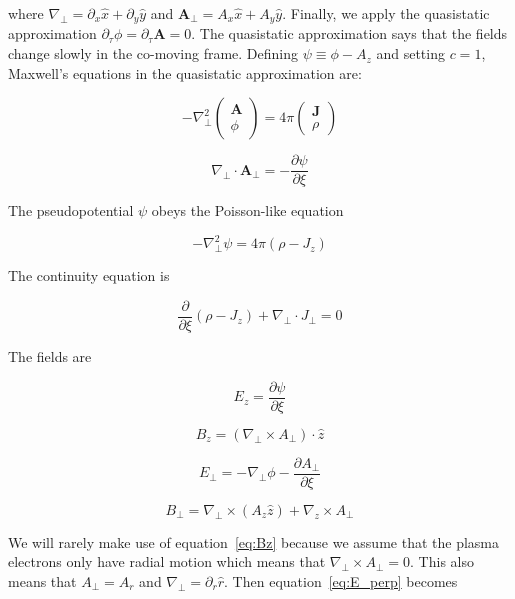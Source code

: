 \documentclass[aps,prl,preprint,groupedaddress]{revtex4-1}
\newcommand{\webvector}[2]{\left( \begin{array}{c} #1 \\ #2 \end{array} \right)}
\begin{document}
where $\nabla_\perp = \partial_x \hat x + \partial_y \hat y$ and $\mathbf{A}_\perp = A_x \hat x + A_y \hat y$. Finally, we apply the quasistatic approximation $\partial_\tau \phi = \partial_\tau \mathbf{A} = 0$. The quasistatic approximation says that the fields change slowly in the co-moving frame. Defining $\psi \equiv \phi - A_z$ and setting $c = 1$, Maxwell's equations in the quasistatic approximation are:

\begin{equation}\label{eq:max_qs}
-\nabla^2_\perp \webvector{\mathbf{A}}{\phi} = 4\pi \webvector{\mathbf{J}}{\rho}
\end{equation}

\begin{equation}\label{eq:gauge_qs}
\nabla_\perp \cdot \mathbf{A}_\perp = -\frac{\partial \psi}{\partial \xi}
\end{equation}

The pseudopotential $\psi$ obeys the Poisson-like equation

\begin{equation}\label{eq:Poisson}
-\nabla^2_\perp \psi = 4\pi(\rho - J_z)
\end{equation}

The continuity equation is

\begin{equation}\label{eq:Cont}
\frac{\partial}{\partial \xi} (\rho - J_z) + \nabla_\perp \cdot J_\perp = 0
\end{equation}

The fields are 

\begin{equation}\label{eq:Ez}
E_z = \frac{\partial \psi}{\partial \xi}
\end{equation} 

\begin{equation}\label{eq:Bz}
B_z = (\nabla_\perp \times A_\perp)\cdot \hat{z}
\end{equation} 

\begin{equation}\label{eq:E_perp}
E_\perp = -\nabla_\perp \phi - \frac{\partial A_\perp}{\partial \xi}
\end{equation}

\begin{equation}\label{eq:B_perp}
B_\perp = \nabla_\perp \times (A_z \hat{z}) + \nabla_z \times A_\perp
\end{equation}

We will rarely make use of equation~\ref{eq:Bz} because we assume that the plasma electrons only have radial motion which means that $\nabla_\perp \times A_\perp = 0$. This also means that $A_{\perp} = A_r$ and $\nabla_\perp = \partial_r \hat{r}$. Then equation~\ref{eq:E_perp} becomes
\end{document}

